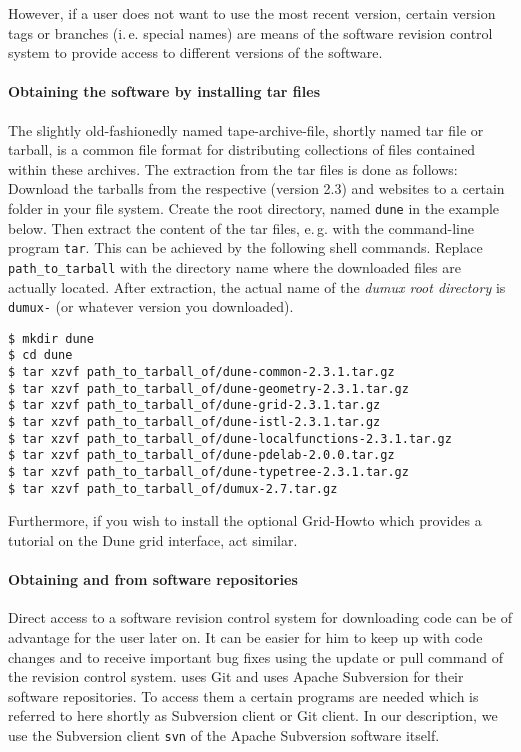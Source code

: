 However, if a user does not want to use the most recent version,
certain version tags or branches (i.\,e. special names) are means
of the software revision control system to provide access to different versions of the software.

\paragraph{Obtaining the software by installing tar files}
The slightly old-fashionedly named tape-archive-file, shortly named tar file or
tarball, is a common file format for distributing collections of files contained
within these archives.
The extraction from the tar files is done as follows:
Download the tarballs from the respective \Dune (version 2.3) and \Dumux websites
to a certain folder in your file system.
Create the {\Dune} root directory, named \texttt{dune} in the example below.
Then extract the content of the tar files, e.\,g. with the command-line program
\texttt{tar}.
This can be achieved by the following shell commands. Replace \texttt{path\_to\_tarball}
with the directory name where the downloaded files are actually located.
After extraction, the actual name of the \emph{dumux root directory} is \texttt{dumux-\DumuxVersion}
(or whatever version you downloaded).

\begin{lstlisting}[style=Bash]
$ mkdir dune
$ cd dune
$ tar xzvf path_to_tarball_of/dune-common-2.3.1.tar.gz
$ tar xzvf path_to_tarball_of/dune-geometry-2.3.1.tar.gz
$ tar xzvf path_to_tarball_of/dune-grid-2.3.1.tar.gz
$ tar xzvf path_to_tarball_of/dune-istl-2.3.1.tar.gz
$ tar xzvf path_to_tarball_of/dune-localfunctions-2.3.1.tar.gz
$ tar xzvf path_to_tarball_of/dune-pdelab-2.0.0.tar.gz
$ tar xzvf path_to_tarball_of/dune-typetree-2.3.1.tar.gz
$ tar xzvf path_to_tarball_of/dumux-2.7.tar.gz
\end{lstlisting}

Furthermore, if you wish to install the optional \Dune Grid-Howto which provides a tutorial
on the Dune grid interface, act similar.

\paragraph{Obtaining \Dune and \Dumux from software repositories}
Direct access to a software revision control system for downloading code can be of advantage for the user later on.
It can be easier for him to keep up with code changes and to receive important bug fixes using
the update or pull command of the revision control system. \Dune uses Git and \Dumux uses Apache
Subversion for their software repositories. To access them a certain programs are needed which
is referred to here shortly as Subversion client or Git client. In our description, we use the
Subversion client \texttt{svn} of the Apache Subversion software itself.

